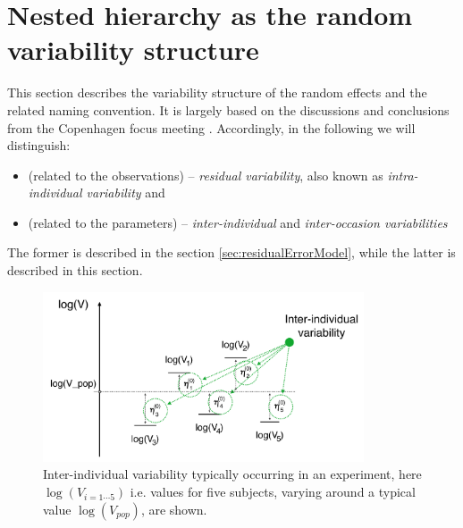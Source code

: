 \section{Nested hierarchy as the random variability structure}
\label{sec:variabilityModel}
\label{math:variability}

This section describes the variability structure of the random effects and the related naming convention. It is largely based on the discussions and conclusions from the Copenhagen focus meeting \cite{Copenhagen:2013}. Accordingly, in the following we will distinguish: 
\begin{itemize}
\item
(related to the observations) -- \textit{residual variability}, also known as \textit{intra-individual variability} and
\item
(related to the parameters) -- \textit{inter-individual} and \textit{inter-occasion variabilities}
\end{itemize}
The former is described in the section \ref{sec:residualErrorModel}, while the latter is described in this section.

\begin{figure}[htb!]
\centering
  \includegraphics[width=95mm]{pics/Subject-level.pdf}
 \caption{Inter-individual variability typically occurring in an experiment, here $\log(V_{i=1\cdots5})$ i.e. values for five subjects, varying around a typical value $\log(V_{pop})$, are shown.}
 \label{fig:subjectLevelVariability}
\end{figure}

